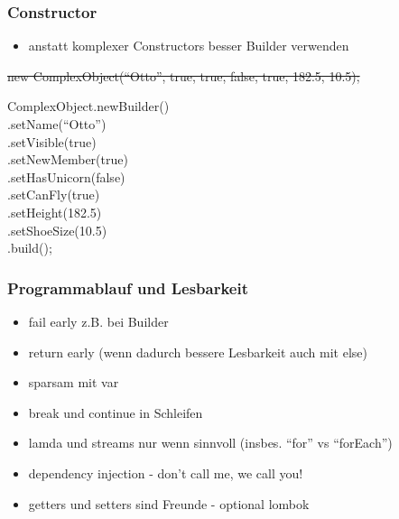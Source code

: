 \begin{frame}
\frametitle{Constructor}
  \begin{itemize}
    \item anstatt komplexer Constructors besser Builder verwenden
    \end{itemize}
  \begin{Beispiel}
  \par \sout{new ComplexObject(``Otto'', true, true, false, true, 182.5, 10.5);}
  \par ComplexObject.newBuilder()\\
    \hspace*{24.5mm}.setName(``Otto'')\\
    \hspace*{24.5mm}.setVisible(true)\\
    \hspace*{24.5mm}.setNewMember(true)\\
    \hspace*{24.5mm}.setHasUnicorn(false)\\
    \hspace*{24.5mm}.setCanFly(true)\\
    \hspace*{24.5mm}.setHeight(182.5)\\
    \hspace*{24.5mm}.setShoeSize(10.5)\\
    \hspace*{24.5mm}.build();
  \end{Beispiel}
\end{frame}

\begin{frame}
\frametitle{Programmablauf und Lesbarkeit}
  \begin{itemize}
    \item fail early z.B. bei Builder
    \item return early (wenn dadurch bessere Lesbarkeit auch mit else)
    \item sparsam mit var
    \item break und continue in Schleifen
    \item lamda und streams nur wenn sinnvoll (insbes. ``for'' vs ``forEach'')
    \item dependency injection - don't call me, we call you!
    \item getters und setters sind Freunde - optional lombok
    \end{itemize}
  \begin{Beispiel}
  \par 
  \end{Beispiel}

\end{frame}

